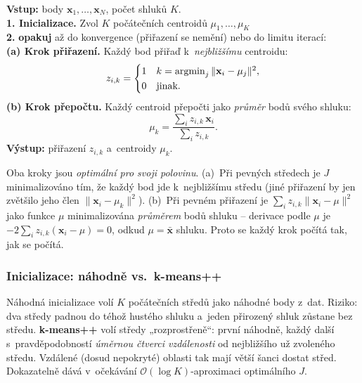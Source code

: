 \begin{algo}
\textbf{Vstup:} body $\mathbf{x}_1,\dots,\mathbf{x}_N$, počet shluků $K$.\\[2pt]
\textbf{1. Inicializace.} Zvol $K$ počátečních centroidů $\mu_1,\dots,\mu_K$ \\[2pt]
\textbf{2.} \textbf{opakuj} až do konvergence (přiřazení se nemění) nebo do limitu iterací:\\
\hspace*{1.5em}\textbf{(a) Krok přiřazení.} Každý bod přiřaď k~\emph{nejbližšímu} centroidu:\hfill{}
\[
  z_{i,k}=\begin{cases}1 & k=\operatorname*{argmin}_{j}\|\mathbf{x}_i-\mu_j\|^2,\\[1pt]0 & \text{jinak.}\end{cases}
\]
\hspace*{1.5em}\textbf{(b) Krok přepočtu.} Každý centroid přepočti jako \emph{průměr} bodů svého shluku:\hfill{}
\[
  \mu_k=\frac{\sum_i z_{i,k}\,\mathbf{x}_i}{\sum_i z_{i,k}} .
\]
\textbf{Výstup:} přiřazení $z_{i,k}$ a~centroidy $\mu_k$.
\end{algo}

\begin{intuice}
Oba kroky jsou \emph{optimální pro svoji polovinu}. (a)~Při pevných středech je $J$ minimalizováno tím, že každý bod jde k~nejbližšímu středu (jiné přiřazení by jen zvětšilo jeho člen $\|\mathbf{x}_i-\mu_k\|^2$). (b)~Při pevném přiřazení je $\sum_i z_{i,k}\|\mathbf{x}_i-\mu\|^2$ jako funkce $\mu$ minimalizována \emph{průměrem} bodů shluku -- derivace podle $\mu$ je $-2\sum_i z_{i,k}(\mathbf{x}_i-\mu)=0$, odkud $\mu=\bar{\mathbf{x}}$ shluku. Proto se každý krok počítá tak, jak se počítá.
\end{intuice}

\subsubsection*{Inicializace: náhodně vs.\ k-means++}

Náhodná inicializace volí $K$ počátečních středů jako náhodné body z~dat. Riziko: dva středy padnou do téhož hustého shluku a~jeden přirozený shluk zůstane bez středu. \textbf{k-means++} volí středy „rozprostřeně``: první náhodně, každý další s~pravděpodobností \emph{úměrnou čtverci vzdálenosti} od nejbližšího už zvoleného středu. Vzdálené (dosud nepokryté) oblasti tak mají větší šanci dostat střed. Dokazatelně dává v~očekávání $\mathcal{O}(\log K)$-aproximaci optimálního $J$.

